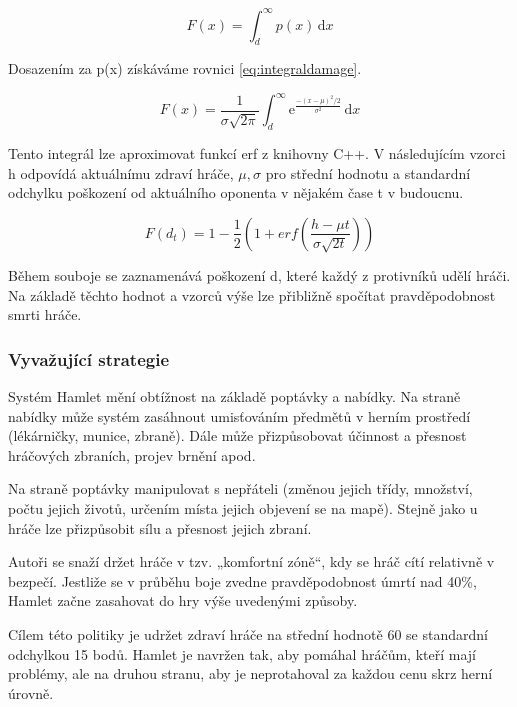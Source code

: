 \begin{equation}
	   F(x) = \int_d^\infty p(x)\,\mathrm{d}x
\end{equation}

Dosazením za p(x) získáváme rovnici \ref{eq:integraldamage}.

\begin{equation} \label{eq:integraldamage}
	   F(x) = \frac{1}{\sigma\sqrt{2\pi}}\int_d^\infty \mathrm{e}^{\frac{-(x-\mu)^2/2}{\sigma^2}}\,\mathrm{d}x
\end{equation}

Tento integrál lze aproximovat funkcí erf z knihovny C++. V následujícím vzorci h odpovídá aktuálnímu zdraví hráče, $\mu, \sigma$ pro střední hodnotu a standardní odchylku poškození od aktuálního oponenta v nějakém čase t v budoucnu.

\begin{equation}
	   F(d_t) = 1-\frac{1}{2}(1+erf(\frac{h-\mu t}{\sigma\sqrt{2t}}))
\end{equation}

Během souboje se zaznamenává poškození d, které každý z protivníků udělí hráči. Na základě těchto hodnot a vzorců výše lze přibližně spočítat pravděpodobnost smrti hráče.

\subsubsection{Vyvažující strategie}

Systém Hamlet mění obtížnost na základě poptávky a nabídky. Na straně nabídky může systém zasáhnout umisťováním předmětů v herním prostředí (lékárničky, munice, zbraně). Dále může přizpůsobovat účinnost a přesnost hráčových zbraních, projev brnění apod.

Na straně poptávky manipulovat s nepřáteli (změnou jejich třídy, množství, počtu jejich životů, určením místa jejich objevení se na mapě). Stejně jako u hráče lze přizpůsobit sílu a přesnost jejich zbraní.

Autoři se snaží držet hráče v tzv. „komfortní zóně“, kdy se hráč cítí relativně v bezpečí. Jestliže se v průběhu boje zvedne pravděpodobnost úmrtí nad 40\%, Hamlet začne zasahovat do hry výše uvedenými způsoby.

Cílem této politiky je udržet zdraví hráče na střední hodnotě 60 se standardní odchylkou 15 bodů. Hamlet je navržen tak, aby pomáhal hráčům, kteří mají problémy, ale na druhou stranu, aby je neprotahoval za každou cenu skrz herní úrovně.

